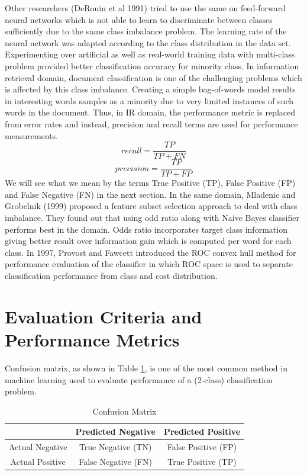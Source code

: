 \documentclass[10pt,journal,compsoc]{IEEEtran}
\begin{document}
Other researchers (DeRouin et al 1991) tried to use the same on feed-forward neural networks which is not able to learn to discriminate between classes sufficiently due to the same class imbalance problem.
The learning rate of the neural network was adapted according to the class distribution in the data set.
Experimenting over artificial as well as real-world training data with multi-class problem provided better classification accuracy for minority class.
In information retrieval domain, document classification is one of the challenging problems which is affected by this class imbalance.
Creating  a simple bag-of-words model results in interesting words samples as a minority due to very limited instances of such words in the document.
Thus, in IR domain, the performance metric is replaced from error rates and instead, precision and recall terms are used for performance measurements.
$$recall = \frac{TP}{TP + FN}$$ $$precision = \frac{TP}{TP + FP}$$
We will see what we mean by the terms True Positive (TP), False Positive (FP) and False Negative (FN) in the next section.
In the same domain, Mladenic and Grobelnik (1999) proposed a feature subset selection approach to deal with class imbalance.
They found out that using odd ratio along with Naive Bayes classifier performs best in the domain. 
Odds ratio incorporates target class information giving better result over information gain which is computed per word for each class.
In 1997, Provost and Fawcett introduced the ROC convex hull method for performance evaluation of the classifier in which ROC space is used to separate classification performance from class and cost distribution. 


\section{Evaluation Criteria and Performance Metrics}
Confusion matrix, as shown in Table \ref{tab:confmat}, is one of the most common method in machine learning used to evaluate performance of a (2-class) classification problem.

\begin{table}[h!]
    \centering
    \begin{tabular}{|c||c|c|}
    	\hline
         & Predicted Negative & Predicted Positive  \\ \hline \hline  
        Actual Negative & True Negative (TN) & False Positive (FP) \\ \hline
        Actual Positive & False Negative (FN) & True Positive (TP) \\ \hline 
    \end{tabular}
    \caption{Confusion Matrix}
    \label{tab:confmat}
\end{table}
\end{document}
